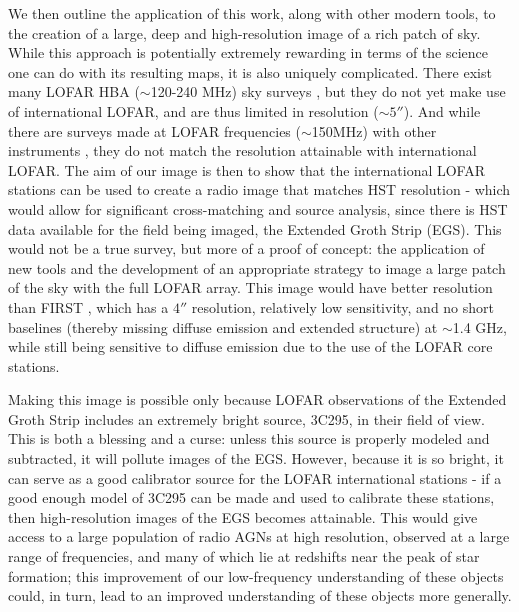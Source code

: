 \pg
We then outline the application of this work, along with other modern tools, to the creation of a large, deep and high-resolution image of a rich patch of sky. While this approach is potentially extremely rewarding in terms of the science one can do with its resulting maps, it is also uniquely complicated. There exist many LOFAR HBA ($\sim$120-240 MHz) sky surveys , but they do not yet make use of international LOFAR, and are thus limited in resolution ($\sim 5''$). And while there are surveys made at LOFAR frequencies ($\sim$150MHz) with other instruments , they do not match the resolution attainable with international LOFAR. The aim of our image is then to show that the international LOFAR stations can be used to create a radio image that matches HST resolution - which would allow for significant cross-matching and source analysis, since there is HST data available for the field being imaged, the Extended Groth Strip (EGS). This would not be a true survey, but more of a proof of concept: the application of new tools and the development of an appropriate strategy to image a large patch of the sky with the full LOFAR array. This image would have better resolution than FIRST , which has a $4''$ resolution, relatively low sensitivity, and no short baselines (thereby missing diffuse emission and extended structure) at $\sim$1.4 GHz, while still being sensitive to diffuse emission due to the use of the LOFAR core stations. 

\pg
Making this image is possible only because LOFAR observations of the Extended Groth Strip includes an extremely bright source, 3C295, in their field of view. This is both a blessing and a curse: unless this source is properly modeled and subtracted, it will pollute images of the EGS. However, because it is so bright, it can serve as a good calibrator source for the LOFAR international stations - if a good enough model of 3C295 can be made and used to calibrate these stations, then high-resolution images of the EGS becomes attainable. This would give access to a large population of radio AGNs at high resolution, observed at a large range of frequencies, and many of which lie at redshifts near the peak of star formation; this improvement of our low-frequency understanding of these objects could, in turn, lead to an improved understanding of these objects more generally.

